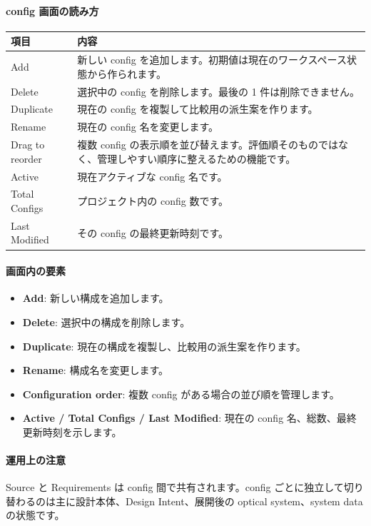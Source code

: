 \documentclass[11pt]{article}
\begin{document}
\paragraph{config 画面の読み方}
\begin{center}
\small
\begin{tabular}{p{3.2cm} p{10.4cm}}
\toprule
項目 & 内容 \\
\midrule
Add & 新しい config を追加します。初期値は現在のワークスペース状態から作られます。 \\
Delete & 選択中の config を削除します。最後の 1 件は削除できません。 \\
Duplicate & 現在の config を複製して比較用の派生案を作ります。 \\
Rename & 現在の config 名を変更します。 \\
Drag to reorder & 複数 config の表示順を並び替えます。評価順そのものではなく、管理しやすい順序に整えるための機能です。 \\
Active & 現在アクティブな config 名です。 \\
Total Configs & プロジェクト内の config 数です。 \\
Last Modified & その config の最終更新時刻です。 \\
\bottomrule
\end{tabular}
\normalsize
\end{center}

\paragraph{画面内の要素}
\begin{itemize}
  \item \textbf{Add}: 新しい構成を追加します。
  \item \textbf{Delete}: 選択中の構成を削除します。
  \item \textbf{Duplicate}: 現在の構成を複製し、比較用の派生案を作ります。
  \item \textbf{Rename}: 構成名を変更します。
  \item \textbf{Configuration order}: 複数 config がある場合の並び順を管理します。
  \item \textbf{Active / Total Configs / Last Modified}: 現在の config 名、総数、最終更新時刻を示します。
\end{itemize}

\paragraph{運用上の注意}
Source と Requirements は config 間で共有されます。config ごとに独立して切り替わるのは主に設計本体、Design Intent、展開後の optical system、system data の状態です。
\end{document}
